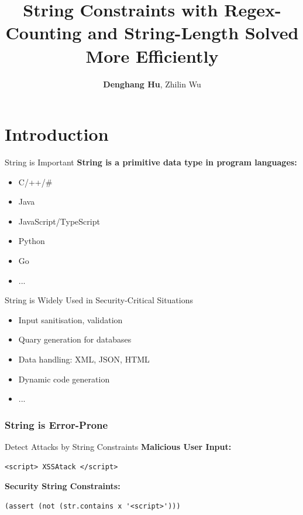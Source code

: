 \documentclass[landscape]{beamer}
\title{String Constraints with Regex-Counting and
String-Length Solved More Efficiently}
\author{\textbf{Denghang Hu}, Zhilin Wu}
\institute{Institute of Software, University of Chinese Academy of Sciences}
\begin{document}
\frame{\titlepage}

\section{Introduction}

\begin{frame}{String is Important}
  \textbf{String is a primitive data type in program languages:}
  \begin{itemize}
    \item C/++/\#
    \item Java
    \item JavaScript/TypeScript
    \item Python
    \item Go
    \item ...
  \end{itemize}
\end{frame}

\begin{frame}{String is Widely Used in Security-Critical Situations}
  \begin{itemize}
    \item Input sanitisation, validation
    \item Quary generation for databases
    \item Data handling: XML, JSON, HTML
    \item Dynamic code generation
    \item ...
  \end{itemize}
\end{frame}


\begin{frame}
  \frametitle{String is Error-Prone}
\end{frame}

\begin{frame}[fragile]{Detect Attacks by String Constraints}
  \textbf{Malicious User Input:}
  \begin{lstlisting}[style=myjs]
      <script> XSSAtack </script>
    \end{lstlisting}
  \textbf{Security String Constraints:}
  \begin{lstlisting}[style=myjs]
    (assert (not (str.contains x '<script>')))
  \end{lstlisting}
\end{frame}
\end{document}
